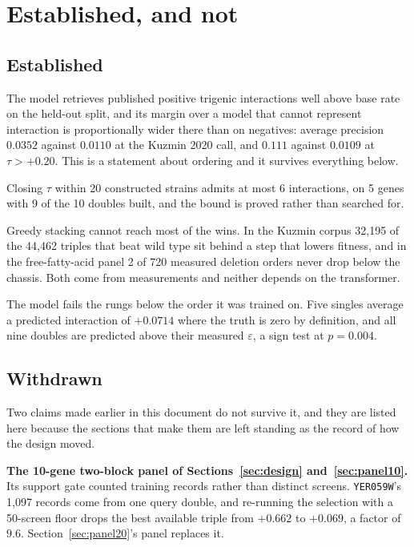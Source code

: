 \section{Established, and not}

\subsection{Established}

The model retrieves published positive trigenic interactions well above base rate
on the held-out split, and its margin over a model that cannot represent
interaction is proportionally wider there than on negatives: average precision
$0.0352$ against $0.0110$ at the Kuzmin 2020 call, and $0.111$ against $0.0109$
at $\tau > +0.20$. This is a statement about ordering and it survives everything
below.

Closing $\tau$ within 20 constructed strains admits at most 6 interactions, on 5
genes with 9 of the 10 doubles built, and the bound is proved rather than
searched for.

Greedy stacking cannot reach most of the wins. In the Kuzmin corpus 32{,}195 of
the 44{,}462 triples that beat wild type sit behind a step that lowers fitness,
and in the free-fatty-acid panel 2 of 720 measured deletion orders never drop
below the chassis. Both come from measurements and neither depends on the
transformer.

The model fails the rungs below the order it was trained on. Five singles average
a predicted interaction of $+0.0714$ where the truth is zero by definition, and
all nine doubles are predicted above their measured $\varepsilon$, a sign test at
$p = 0.004$.

\subsection{Withdrawn}

Two claims made earlier in this document do not survive it, and they are listed
here because the sections that make them are left standing as the record of how
the design moved.

\textbf{The 10-gene two-block panel of Sections~\ref{sec:design}
and~\ref{sec:panel10}.} Its support gate
counted training records rather than distinct screens. \texttt{YER059W}'s 1{,}097
records come from one query double, and re-running the selection with a 50-screen
floor drops the best available triple from $+0.662$ to $+0.069$, a factor of
$9.6$. Section~\ref{sec:panel20}'s panel replaces it.

